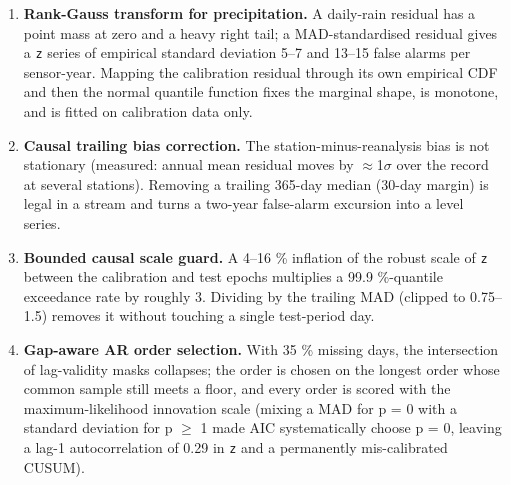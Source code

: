 \documentclass[10pt,a4paper]{article}
\begin{document}
\begin{enumerate}
\item \textbf{Rank-\allowbreak{}Gauss transform for precipitation.} A daily-\allowbreak{}rain residual has a point
mass at zero and a heavy right tail; a MAD-\allowbreak{}standardised residual gives a \texttt{z} series of empirical standard deviation 5–7 and 13–15 false alarms per sensor-\allowbreak{}year. Mapping the calibration residual through its own empirical CDF and then the normal quantile function fixes the marginal shape, is monotone, and is fitted on calibration data only.

\item \textbf{Causal trailing bias correction.} The station-\allowbreak{}minus-\allowbreak{}reanalysis bias is not
stationary (measured: annual mean residual moves by $\approx$1$\sigma$ over the record at several stations). Removing a trailing 365-\allowbreak{}day median (30-\allowbreak{}day margin) is legal in a stream and turns a two-\allowbreak{}year false-\allowbreak{}alarm excursion into a level series.

\item \textbf{Bounded causal scale guard.} A 4–16 \% inflation of the robust scale of \texttt{z}
between the calibration and test epochs multiplies a 99.9 \%-\allowbreak{}quantile exceedance rate by roughly 3. Dividing by the trailing MAD (clipped to 0.75–1.5) removes it without touching a single test-\allowbreak{}period day.

\item \textbf{Gap-\allowbreak{}aware AR order selection.} With 35 \% missing days, the intersection of
lag-\allowbreak{}validity masks collapses; the order is chosen on the longest order whose common sample still meets a floor, and every order is scored with the maximum-\allowbreak{}likelihood innovation scale (mixing a MAD for p = 0 with a standard deviation for p $\geq$ 1 made AIC systematically choose p = 0, leaving a lag-\allowbreak{}1 autocorrelation of 0.29 in \texttt{z} and a permanently mis-\allowbreak{}calibrated CUSUM).

\end{enumerate}
\end{document}
